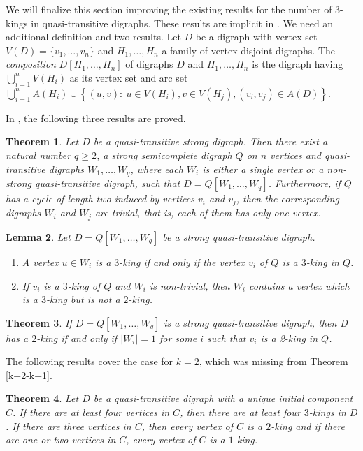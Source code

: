 \documentclass[preprint]{elsarticle}
\newtheorem{thm}{Theorem}[section]
\newtheorem{lem}[thm]{Lemma}
\begin{document}
We will finalize this section improving the existing results for the number of $3$-kings in quasi-transitive digraphs.   These results are implicit in \cite{BJQT}.   We need an additional definition and two results.   Let $D$ be a digraph with vertex set $V(D) = \{ v_1, \dots, v_n \}$ and $H_1, \dots, H_n$ a family of vertex disjoint digraphs.   The \emph{composition} $D[H_1, \dots, H_n]$ of digraphs $D$ and $H_1, \dots, H_n$ is the digraph having  $\bigcup_{i=1}^n V(H_i)$ as its vertex set and arc set $\bigcup_{i=1}^n A(H_i) \cup \left\{ (u,v) \colon\ u \in V(H_i), v \in V(H_j), (v_i, v_j) \in A(D) \right\}$.

In \cite{BJQT}, the following three results are proved.

\begin{thm} \label{qt-chs}
Let $D$ be a quasi-transitive strong digraph.    Then there exist a natural number $q \ge 2$, a strong semicomplete digraph $Q$ on $n$ vertices and quasi-transitive digraphs $W_1, \dots,  W_q$, where each $W_i$ is either a single vertex or a non-strong quasi-transitive digraph, such that $D= Q[W_1, \dots, W_q]$. Furthermore, if $Q$ has a cycle of length two induced by vertices $v_i$ and $v_j$, then the corresponding digraphs $W_i$ and $W_j$ are trivial, that is, each of them has only one vertex.
\end{thm}

\begin{lem} \label{3kqtlem}
	Let $D = Q[W_1, \dots, W_q]$ be a strong quasi-transitive digraph.
	\begin{enumerate}
	\item A vertex $u \in W_i$ is a $3$-king if and only if the vertex $v_i$ of $Q$ is a $3$-king in $Q$.
	\item If $v_i$ is a $3$-king of $Q$ and $W_i$ is non-trivial, then $W_i$ contains a vertex which is a $3$-king but is not a $2$-king.
	\end{enumerate}
\end{lem}

\begin{thm} \label{2kqt}
If $D = Q[W_1, \dots, W_q]$ is a strong quasi-transitive digraph, then D has a $2$-king if and only if $|W_i| = 1$ for some $i$ such that $v_i$ is a 2-king in $Q$.
\end{thm}

The following results cover the case for $k=2$, which was missing from Theorem \ref{k+2-k+1}.

\begin{thm}
	Let $D$ be a quasi-transitive digraph with a unique initial component $C$.   If there are at least four vertices in $C$, then there are at least four $3$-kings in $D$.   If there are three vertices in $C$, then every vertex of $C$ is a $2$-king and if there are one or two vertices in $C$, every vertex of $C$ is a $1$-king.
\end{thm}
\end{document}
